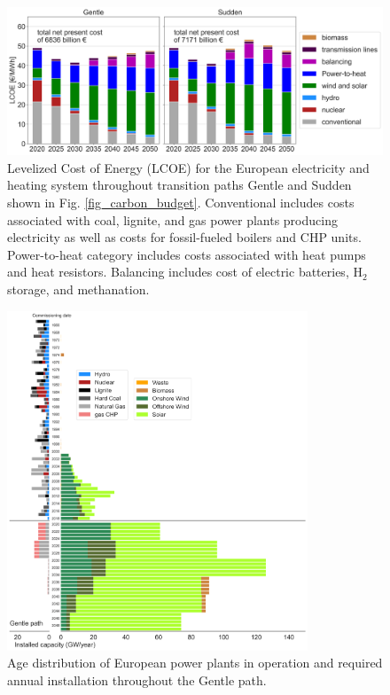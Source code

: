 \documentclass[5p]{elsarticle} %
\begin{document}
\begin{figure}[!h]
\centering
\includegraphics[width=14cm]{figures/LCOE_Base.png}
\caption{\textcolor[rgb]{1,0,0}{Levelized Cost of Energy (LCOE) for the European electricity and heating system throughout transition paths Gentle and Sudden shown in Fig. \ref{fig_carbon_budget}. Conventional includes costs associated with coal, lignite, and gas power plants producing electricity as well as costs for fossil-fueled boilers and CHP units. Power-to-heat category includes costs associated with heat pumps and heat resistors. Balancing includes cost of electric batteries, H$_2$ storage, and methanation. }} \label{fig_system_cost} 
\end{figure}

\begin{figure}[!h]
\centering
\includegraphics[width=0.8\textwidth]{figures/age_distribution_Base.png}
\caption{Age distribution of European power plants in operation \cite{powerplantmatching, IRENA_2019} and required annual installation throughout the Gentle path.} \label{fig_age_distribution} 
\end{figure}
\end{document}
